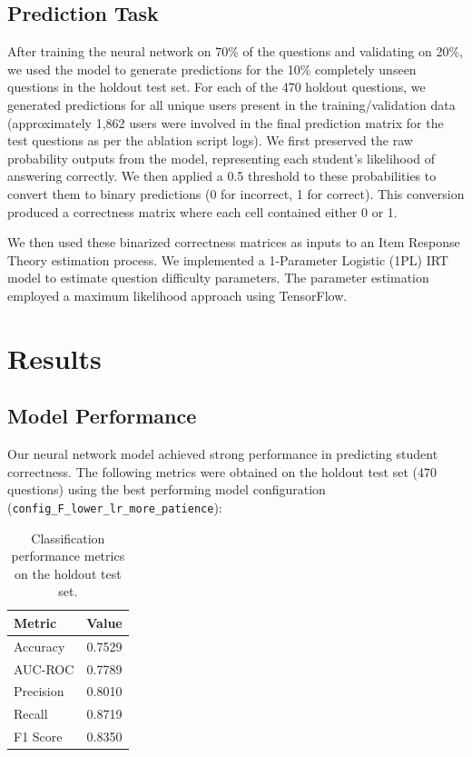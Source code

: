 \documentclass[
    a4paper, %
    10pt, %
    twoside, %
]{LTJournalArticle}
\begin{document}
\subsection{Prediction Task}

After training the neural network on 70\% of the questions and validating on 20\%, we used the model to generate predictions for the 10\% completely unseen questions in the holdout test set. For each of the 470 holdout questions, we generated predictions for all unique users present in the training/validation data (approximately 1,862 users were involved in the final prediction matrix for the test questions as per the ablation script logs). We first preserved the raw probability outputs from the model, representing each student's likelihood of answering correctly. We then applied a 0.5 threshold to these probabilities to convert them to binary predictions (0 for incorrect, 1 for correct). This conversion produced a correctness matrix where each cell contained either 0 or 1.

We then used these binarized correctness matrices as inputs to an Item Response Theory estimation process. We implemented a 1-Parameter Logistic (1PL) IRT model to estimate question difficulty parameters. The parameter estimation employed a maximum likelihood approach using TensorFlow.


\section{Results}

\subsection{Model Performance}

Our neural network model achieved strong performance in predicting student correctness. The following metrics were obtained on the holdout test set (470 questions) using the best performing model configuration (\texttt{config\_F\_lower\_lr\_more\_patience}):

\begin{table}[H]
    \centering
    \begin{tabular}{lc}
        \hline
        \textbf{Metric} & \textbf{Value} \\
        \hline
        Accuracy & 0.7529 \\
        AUC-ROC & 0.7789 \\
        Precision & 0.8010 \\
        Recall & 0.8719 \\
        F1 Score & 0.8350 \\
        \hline
    \end{tabular}
    \caption{Classification performance metrics on the holdout test set.}
    \label{tab:classification-metrics-test}
\end{table}
\end{document}
